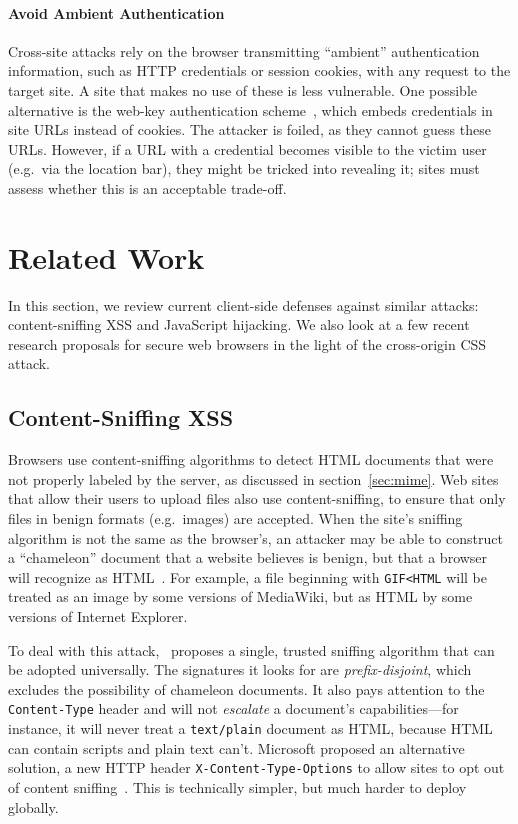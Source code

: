 \documentclass{acm_proc_article-sp}
\begin{document}
\paragraph{Avoid Ambient Authentication}
Cross-site attacks rely on the browser transmitting “ambient”
authentication information, such as HTTP credentials or session
cookies, with any request to the target site.  A site that makes no
use of these is less vulnerable.  One possible alternative is the
web-key authentication scheme~\cite{webkey}, which embeds credentials
in site URLs instead of cookies.  The attacker is foiled, as they
cannot guess these URLs.  However, if a URL with a credential becomes
visible to the victim user (e.g.\ via the location bar), they might be
tricked into revealing it; sites must assess whether this is an
acceptable trade-off.

\section{Related Work} \label{sec:relatedwork}
In this section, we review current client-side defenses against
similar attacks: content-sniffing XSS and JavaScript hijacking.  We
also look at a few recent research proposals for secure web browsers
in the light of the cross-origin CSS attack.

\subsection{Content-Sniffing XSS}
Browsers use content-sniffing algorithms to detect HTML documents that
were not properly labeled by the server, as discussed in
section~\ref{sec:mime}.  Web sites that allow their users to upload
files also use content-sniffing, to ensure that only files in benign
formats (e.g.\ images) are accepted.  When the site's sniffing
algorithm is not the same as the browser's, an attacker may be able to
construct a “chameleon” document that a website believes is benign,
but that a browser will recognize as
HTML~\cite{securecontentsniffing}.  For example, a file beginning with
\verb|GIF<HTML| will be treated as an image by some versions of
MediaWiki, but as HTML by some versions of Internet Explorer.

To deal with this attack,~\cite{securecontentsniffing} proposes a
single, trusted sniffing algorithm that can be adopted universally.
The signatures it looks for are \emph{prefix-disjoint}, which excludes
the possibility of chameleon documents.  It also pays attention to the
\texttt{Content-Type} header and will not \emph{escalate} a document's
capabilities---for instance, it will never treat a \verb|text/plain|
document as HTML, because HTML can contain scripts and plain text
can't.  Microsoft proposed an alternative solution, a new HTTP header
\verb|X-Content-Type-Options| to allow sites to opt out of content
sniffing~\cite{nosniff}.  This is technically simpler, but much harder
to deploy globally.
\end{document}
